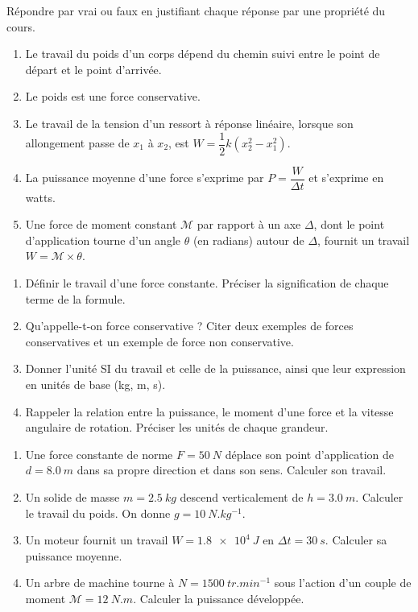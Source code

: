 \documentclass[11pt]{article}
\begin{document}
\begin{exercice}
Répondre par vrai ou faux en justifiant chaque réponse par une propriété du cours.
\begin{enumerate}
\item Le travail du poids d'un corps dépend du chemin suivi entre le point de départ et le point d'arrivée.
\item Le poids est une force conservative.
\item Le travail de la tension d'un ressort à réponse linéaire, lorsque son allongement passe de $x_1$ à $x_2$, est $W = \dfrac{1}{2}k\left(x_2^2 - x_1^2\right)$.
\item La puissance moyenne d'une force s'exprime par $P = \dfrac{W}{\Delta t}$ et s'exprime en watts.
\item Une force de moment constant $\mathcal{M}$ par rapport à un axe $\Delta$, dont le point d'application tourne d'un angle $\theta$ (en radians) autour de $\Delta$, fournit un travail $W = \mathcal{M} \times \theta$.
\end{enumerate}
\end{exercice}

\begin{exercice}
\begin{enumerate}
\item Définir le travail d'une force constante. Préciser la signification de chaque terme de la formule.
\item Qu'appelle-t-on force conservative ? Citer deux exemples de forces conservatives et un exemple de force non conservative.
\item Donner l'unité SI du travail et celle de la puissance, ainsi que leur expression en unités de base (kg, m, s).
\item Rappeler la relation entre la puissance, le moment d'une force et la vitesse angulaire de rotation. Préciser les unités de chaque grandeur.
\end{enumerate}
\end{exercice}

\begin{exercice}
\begin{enumerate}
\item Une force constante de norme $F = \SI{50}{N}$ déplace son point d'application de $d = \SI{8,0}{m}$ dans sa propre direction et dans son sens. Calculer son travail.
\item Un solide de masse $m = \SI{2,5}{kg}$ descend verticalement de $h = \SI{3,0}{m}$. Calculer le travail du poids. On donne $g = \SI{10}{N.kg^{-1}}$.
\item Un moteur fournit un travail $W = \SI{1,8e4}{J}$ en $\Delta t = \SI{30}{s}$. Calculer sa puissance moyenne.
\item Un arbre de machine tourne à $N = \SI{1500}{tr.min^{-1}}$ sous l'action d'un couple de moment $\mathcal{M} = \SI{12}{N.m}$. Calculer la puissance développée.
\end{enumerate}
\end{exercice}
\end{document}
